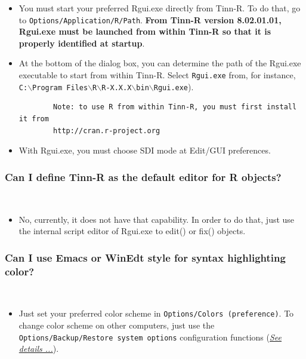 \begin{itemize}
  \item You must start your preferred Rgui.exe directly from Tinn-R. To do that,
    go to \texttt{Options/Application/R/Path}. \textbf{From Tinn-R version 8.02.01.01,
    Rgui.exe must be launched from within Tinn-R so that it is properly
    identified at startup}.
  \item At the bottom of the dialog box, you can determine the path of
    the Rgui.exe executable to start from within Tinn-R. Select
    \texttt{Rgui.exe} from, for instance,
    \texttt{C:$\backslash$Program Files$\backslash$R$\backslash$R-X.X.X$\backslash$bin$\backslash$Rgui.exe}).

    \begin{footnotesize}
      \begin{verbatim}
        Note: to use R from within Tinn-R, you must first install it from
        http://cran.r-project.org
      \end{verbatim}
    \end{footnotesize}

  \item With Rgui.exe, you must choose SDI mode at Edit/GUI preferences.
\end{itemize}


\subsubsection{Can I define Tinn-R as the default editor for R objects?}\\

\begin{itemize}
  \item No, currently, it does not have that capability. In order to do that,
    just use the internal script editor of Rgui.exe to edit() or fix() \RR{} objects.
\end{itemize}


\subsubsection{Can I use Emacs or WinEdt style for syntax highlighting color?}\\

\begin{itemize}
  \item Just set your preferred color scheme in \texttt{Options/Colors (preference)}.
    To change color scheme on other computers, just use the
    \texttt{Options/Backup/Restore system options} configuration functions
    (\textit{\href{\#faq\_preferences}{See details ...}}).
\end{itemize}



